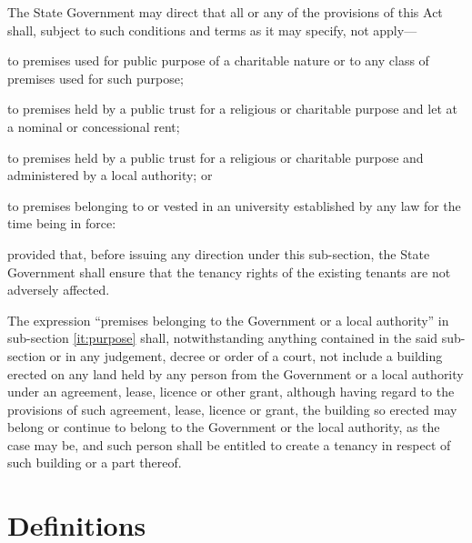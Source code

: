 \documentclass{mhact}
\begin{document}
\begin{subsectionlist}
\item The State Government may direct that all or any of the
  provisions of this Act shall, subject to such conditions and terms
  as it may specify, not apply---
  \begin{clause}
  \item to premises used for public purpose of a charitable nature or to any
    class of premises used for such purpose;
  \item to premises held by a public trust for a religious or
    charitable purpose and let at a nominal or concessional rent;
  \item  to premises held by a public trust for a religious or
    charitable purpose and administered by a local authority; or
  \item to premises belonging to or vested in an university
    established by any law for the time being in force:
  \end{clause}
  provided that, before issuing any direction under this sub-section,
  the State Government shall ensure that the tenancy rights of the
  existing tenants are not adversely affected.

\item The expression ``premises belonging to the Government or a local
  authority'' in sub-section \ref{it:purpose} shall, notwithstanding
  anything contained in the said sub-section or in any judgement,
  decree or order of a court, not include a building erected on any
  land held by any person from the Government or a local authority
  under an agreement, lease, licence or other grant, although having
  regard to the provisions of such agreement, lease, licence or grant,
  the building so erected may belong or continue to belong to the
  Government or the local authority, as the case may be, and such
  person shall be entitled to create a tenancy in respect of such
  building or a part thereof.
\end{subsectionlist}

\section{Definitions}
\label{sec:def}
\end{document}
